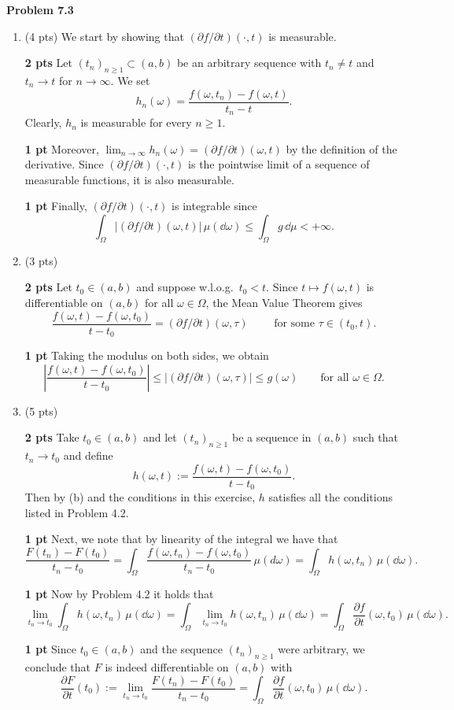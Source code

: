 \bigskip

\textbf{Problem 7.3}

\begin{enumerate}[label={(\alph*)}]
	\item (4 pts) We start by showing that $(\partial f/\partial t)(\cdot,t)$ is measurable. 
	
	\textbf{2 pts}
	Let $(t_n)_{n\ge 1}\subset(a,b)$ be an arbitrary sequence with $t_n\ne t$ and $t_n\to t$ for $n\to\infty$. We set
	\[
		h_n(\omega) = \frac{f(\omega,t_n)-f(\omega,t)}{t_n-t}.
	\]
	Clearly, $h_n$ is measurable for every $n\ge 1$. 
	
	\textbf{1 pt}
	Moreover, $\lim_{n\to\infty} h_n(\omega) = (\partial f/\partial t)(\omega,t)$ by the definition of the derivative. Since $(\partial f/\partial t)(\cdot,t)$ is the pointwise limit of a sequence of measurable functions, it is also measurable. 
	
	\textbf{1 pt} Finally, $(\partial f/\partial t)(\cdot,t)$ is integrable since
	\[
		\int_\Omega |(\partial f/\partial t)(\omega,t)|\,\mu(\dd\omega) \le \int_\Omega g\,\dd\mu <+\infty.
	\]
	
	\item (3 pts)
	
	\textbf{2 pts} Let $t_0\in (a,b)$ and suppose w.l.o.g.\ $t_0<t$. Since $t\mapsto f(\omega,t)$ is differentiable on $(a,b)$ for all $\omega\in\Omega$, the Mean Value Theorem gives
	\[
		\frac{f(\omega,t)-f(\omega,t_0)}{t-t_0} = (\partial f/\partial t)(\omega,\tau)\qquad\text{	for some $\tau\in(t_0,t)$.}
	\]
	
	\textbf{1 pt}
	Taking the modulus on both sides, we obtain
	\[
		\left|\frac{f(\omega,t)-f(\omega,t_0)}{t-t_0}\right| \le |(\partial f/\partial t)(\omega,\tau)|\le g(\omega)\qquad\text{for all $\omega\in\Omega$}.
	\]
	\item (5 pts)
	
	\textbf{2 pts} Take $t_0 \in (a,b)$ and let $(t_n)_{n \ge 1}$ be a sequence in $(a,b)$ such that $t_n \to t_0$ and define
	\[
		h(\omega, t) := \frac{f(\omega, t) - f(\omega, t_0)}{t - t_0}.
	\] 
	Then by (b) and the conditions in this exercise, $h$ satisfies all the conditions listed in Problem 4.2.
	
	\textbf{1 pt}
	Next, we note that by linearity of the integral we have that
	\[
		\frac{F(t_n) - F(t_0)}{t_n - t_0} = \int_\Omega \frac{f(\omega, t_n) - f(\omega, t_0)}{t_n - t_0} \, \mu(d \omega)
		= \int_\Omega h(\omega, t_n) \, \mu(\dd \omega).
	\]
	
	\textbf{1 pt}
	Now by Problem 4.2 it holds that 
	\[
		\lim_{t_n \to t_0} \int_\Omega h(\omega, t_n) \, \mu(\dd \omega) 
		= \int_\Omega \lim_{t_n \to t_0} h(\omega, t_n) \, \mu(\dd \omega) = \int_\Omega \frac{\partial f}{\partial t}(\omega, t_0) \, \mu(\dd \omega).
	\]
	
	\textbf{1 pt}
	Since $t_0 \in(a,b)$ and the sequence $(t_n)_{n\ge 1}$ were arbitrary, we conclude that $F$ is indeed differentiable on $(a,b)$ with 
	\[
		\frac{\partial F}{\partial t}(t_0) := \lim_{t_n \to t_0} \frac{F(t_n) - F(t_0)}{t_n - t_0} 
		= \int_\Omega \frac{\partial f}{\partial t}(\omega,t_0)\,\mu(\dd\omega).
	\]
\end{enumerate}


